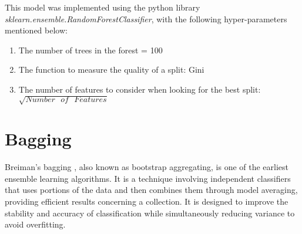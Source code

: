 


This model was implemented using the python library \textit{sklearn.ensemble.RandomForestClassifier}, with the following hyper-parameters mentioned below:

\begin{enumerate}
    \item The number of trees in the forest = 100
    \item The function to measure the quality of a split: Gini
    \item The number of features to consider when looking for the best split: $\sqrt{Number\mbox{ }of\mbox{ }Features}$

\end{enumerate}


\section{Bagging}
Breiman’s bagging \cite{breiman1996bagging}, also known as bootstrap aggregating, is one of the earliest ensemble learning algorithms. It is a technique involving independent classifiers that uses portions of the data and then combines them through model averaging, providing efficient results concerning a collection. It is designed to improve the stability and accuracy of classification \cite{quinlan1987simplifying} while simultaneously reducing variance to avoid overfitting.

